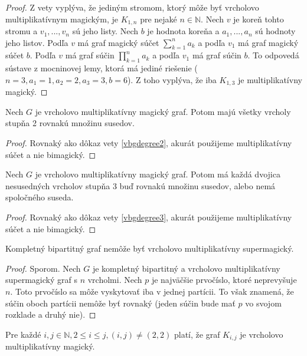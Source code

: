 \begin{proof} Z vety \label{vmmgdegree1} vyplýva, že jediným stromom, ktorý môže byť vrcholovo multiplikatívnym magickým, je $K_{1,n}$ pre nejaké $n \in \mathbb{N}$. Nech $v$ je koreň tohto stromu a $v_1, ... , v_n$ sú jeho listy. Nech $b$ je hodnota koreňa a $a_1, ... , a_n$ sú hodnoty jeho listov. Podľa $v$ má graf magický súčet $\sum_{k=1}^{n} a_k$ a podľa $v_1$ má graf magický súčet $b$. Podľa $v$ má graf súčin $\prod_{k=1}^{n} a_k$ a podľa $v_1$ má graf súčin $b$. To odpovedá sústave z mocninovej lemy, ktorá má jediné riešenie ($n = 3, a_1 = 1, a_2 = 2, a_3 = 3, b = 6$). Z toho vyplýva, že iba $K_{1,3}$ je multiplikatívny magický.
\end{proof}

\begin{subtheorem} Nech $G$ je vrcholovo multiplikatívny magický graf. Potom majú všetky vrcholy stupňa 2 rovnakú množinu susedov.
\end{subtheorem}

\begin{proof} Rovnaký ako dôkaz vety \ref{vbgdegree2}, akurát použijeme multiplikatívny súčet a nie bimagický.
\end{proof}

\begin{subtheorem} Nech $G$ je vrcholovo multiplikatívny magický graf. Potom má každá dvojica nesusedných vrcholov stupňa 3 buď rovnakú množinu susedov, alebo nemá spoločného suseda.
\end{subtheorem}

\begin{proof} Rovnaký ako dôkaz vety \ref{vbgdegree3}, akurát použijeme multiplikatívny súčet a nie bimagický.
\end{proof}

\begin{subtheorem} Kompletný bipartitný graf nemôže byť vrcholovo multiplikatívny supermagický.
\end{subtheorem}

\begin{proof} Sporom. Nech $G$ je kompletný bipartitný a vrcholovo multiplikatívny supermagický graf s $n$ vrcholmi. Nech $p$ je najväčšie prvočíslo, ktoré neprevyšuje $n$. Toto prvočíslo sa môže vyskytovať iba v jednej partícii. To však znamená, že súčin oboch partícii nemôže byť rovnaký (jeden súčin bude mať $p$ vo svojom rozklade a druhý nie).
\end{proof}

\begin{subtheorem}
\label{vmmgkij}
Pre každé $i,j \in \mathbb{N}, 2 \leq i \leq j, (i, j) \neq (2, 2)$ platí, že graf $K_{i,j}$ je vrcholovo multiplikatívny magický.
\end{subtheorem}

